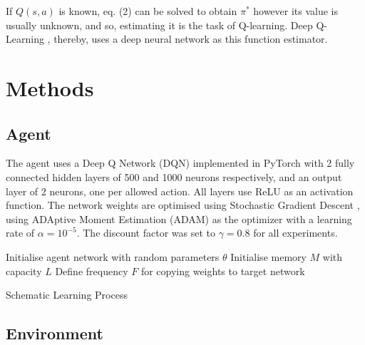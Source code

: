 \documentclass[conference]{IEEEtran}
\begin{document}
If $Q(s,a)$ is known, eq. (2) can be solved to obtain $\pi^*$ however its value is usually unknown, and so, estimating it is the task of Q-learning. Deep Q-Learning \cite{mnih2015}, thereby, uses a deep neural network as this function estimator.

\section{Methods} \label{methods}
\subsection{Agent}
The agent uses a Deep Q Network (DQN) implemented in PyTorch \cite{pytorch} with 2 fully connected hidden layers of 500 and 1000 neurons respectively, and an output layer of 2 neurons, one per allowed action.
All layers use ReLU as an activation function. The network weights are optimised using Stochastic Gradient Descent \cite{kiefer}, using ADAptive Moment Estimation (ADAM) \cite{adam} as the optimizer with a learning rate of $\alpha=10^{-5}$. The discount factor was set to $\gamma=0.8$ for all experiments.

\begin{algorithm}
\SetAlgoLined
 Initialise agent network with random parameters $\theta$\;
 Initialise memory $M$ with capacity $L$\;
 Define frequency $F$ for copying weights to target network\;
 \caption{Schematic Learning Process}
\end{algorithm}
\subsection{Environment}
\end{document}
